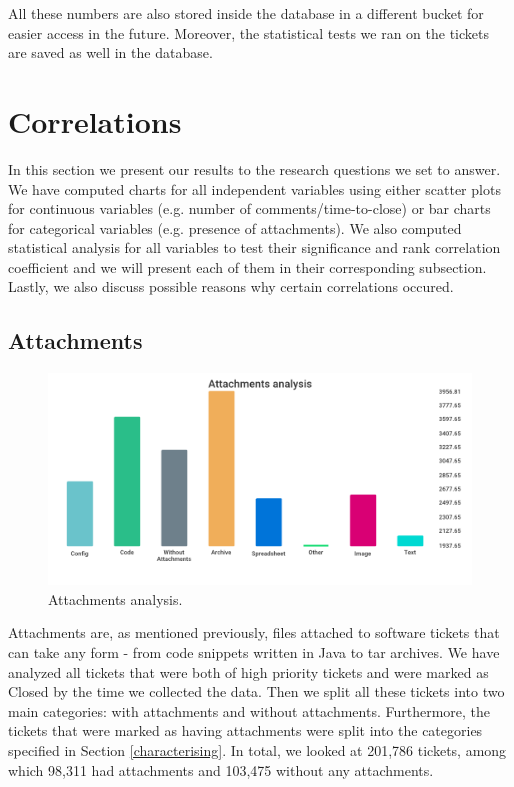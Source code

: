 \documentclass{mpaper}
\begin{document}
All these numbers are also stored inside the database in a different bucket for easier access in the future. Moreover, the statistical 
tests we ran on the tickets are saved as well in the database.

\section{Correlations}\label{correlations}

In this section we present our results to the research questions we set to answer. We have computed charts for all 
independent variables using either scatter plots for continuous variables (e.g. number of comments/time-to-close) 
or bar charts for categorical variables (e.g. presence of attachments). We also computed statistical analysis for 
all variables to test their significance and rank correlation coefficient and we will present each of them in their 
corresponding subsection. Lastly, we also discuss possible reasons why certain correlations occured.

\subsection{Attachments}

\begin{figure}[ht]
  \begin{center}
  \includegraphics[scale=0.23]{images/attachments.png}
  \end{center}
  \caption{\label{attachments}Attachments analysis.}
\end{figure}

Attachments are, as mentioned previously, files attached to software tickets that can take any form - from code 
snippets written in Java to tar archives. We have analyzed all tickets that were both of high priority tickets and
were marked as Closed by the time we collected the data. Then we split all these tickets into two main categories: 
with attachments and without attachments. Furthermore, the tickets that were marked as having attachments were split 
into the categories specified in Section \ref{characterising}. In total, we looked at 201,786 tickets, among which 
98,311 had attachments and 103,475 without any attachments.
\end{document}
